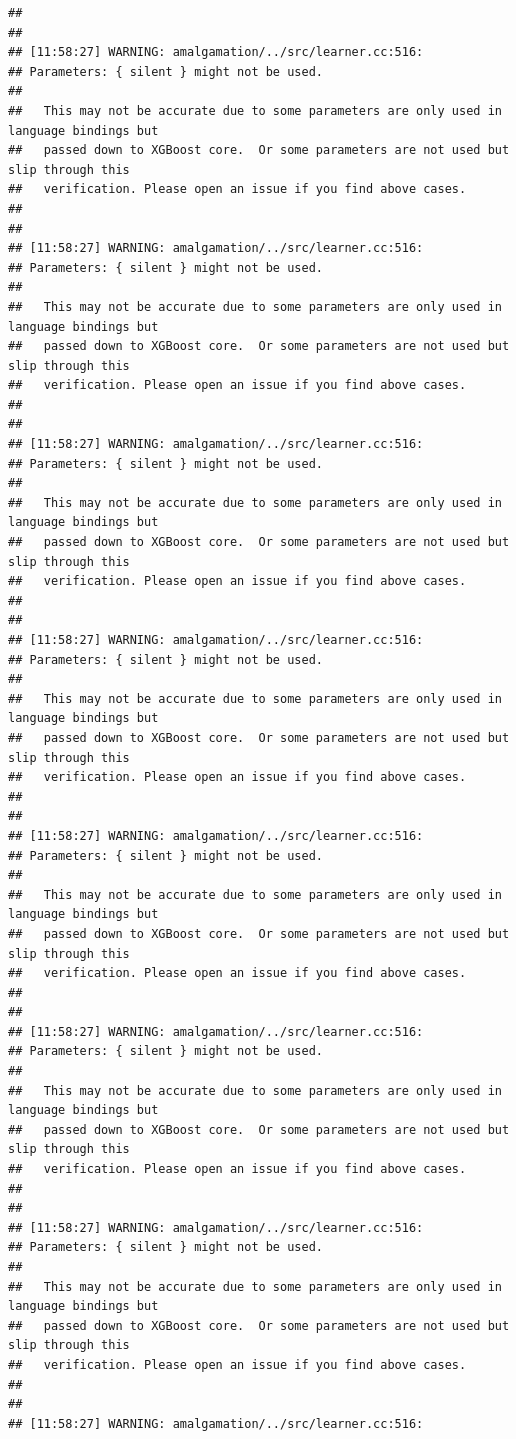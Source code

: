 \documentclass[AMS,STIX2COL]{WileyNJD-v2}\usepackage[]{graphicx}\usepackage[]{color}
\makeatletter
\newenvironment{kframe}{%
 \def\at@end@of@kframe{}%
 \ifinner\ifhmode%
  \def\at@end@of@kframe{\end{minipage}}%
  \begin{minipage}{\columnwidth}%
 \fi\fi%
 \def\FrameCommand##1{\hskip\@totalleftmargin \hskip-\fboxsep
 \colorbox{shadecolor}{##1}\hskip-\fboxsep
     \hskip-\linewidth \hskip-\@totalleftmargin \hskip\columnwidth}%
 \MakeFramed {\advance\hsize-\width
   \@totalleftmargin\z@ \linewidth\hsize
   \@setminipage}}%
 {\par\unskip\endMakeFramed%
 \at@end@of@kframe}
\newenvironment{knitrout}{}{} %
\makeatother
\begin{document}
\begin{knitrout}
\begin{kframe}
\begin{verbatim}
## 
## 
## [11:58:27] WARNING: amalgamation/../src/learner.cc:516: 
## Parameters: { silent } might not be used.
## 
##   This may not be accurate due to some parameters are only used in language bindings but
##   passed down to XGBoost core.  Or some parameters are not used but slip through this
##   verification. Please open an issue if you find above cases.
## 
## 
## [11:58:27] WARNING: amalgamation/../src/learner.cc:516: 
## Parameters: { silent } might not be used.
## 
##   This may not be accurate due to some parameters are only used in language bindings but
##   passed down to XGBoost core.  Or some parameters are not used but slip through this
##   verification. Please open an issue if you find above cases.
## 
## 
## [11:58:27] WARNING: amalgamation/../src/learner.cc:516: 
## Parameters: { silent } might not be used.
## 
##   This may not be accurate due to some parameters are only used in language bindings but
##   passed down to XGBoost core.  Or some parameters are not used but slip through this
##   verification. Please open an issue if you find above cases.
## 
## 
## [11:58:27] WARNING: amalgamation/../src/learner.cc:516: 
## Parameters: { silent } might not be used.
## 
##   This may not be accurate due to some parameters are only used in language bindings but
##   passed down to XGBoost core.  Or some parameters are not used but slip through this
##   verification. Please open an issue if you find above cases.
## 
## 
## [11:58:27] WARNING: amalgamation/../src/learner.cc:516: 
## Parameters: { silent } might not be used.
## 
##   This may not be accurate due to some parameters are only used in language bindings but
##   passed down to XGBoost core.  Or some parameters are not used but slip through this
##   verification. Please open an issue if you find above cases.
## 
## 
## [11:58:27] WARNING: amalgamation/../src/learner.cc:516: 
## Parameters: { silent } might not be used.
## 
##   This may not be accurate due to some parameters are only used in language bindings but
##   passed down to XGBoost core.  Or some parameters are not used but slip through this
##   verification. Please open an issue if you find above cases.
## 
## 
## [11:58:27] WARNING: amalgamation/../src/learner.cc:516: 
## Parameters: { silent } might not be used.
## 
##   This may not be accurate due to some parameters are only used in language bindings but
##   passed down to XGBoost core.  Or some parameters are not used but slip through this
##   verification. Please open an issue if you find above cases.
## 
## 
## [11:58:27] WARNING: amalgamation/../src/learner.cc:516: 

\end{verbatim}
\end{kframe}
\end{knitrout}
\end{document}

